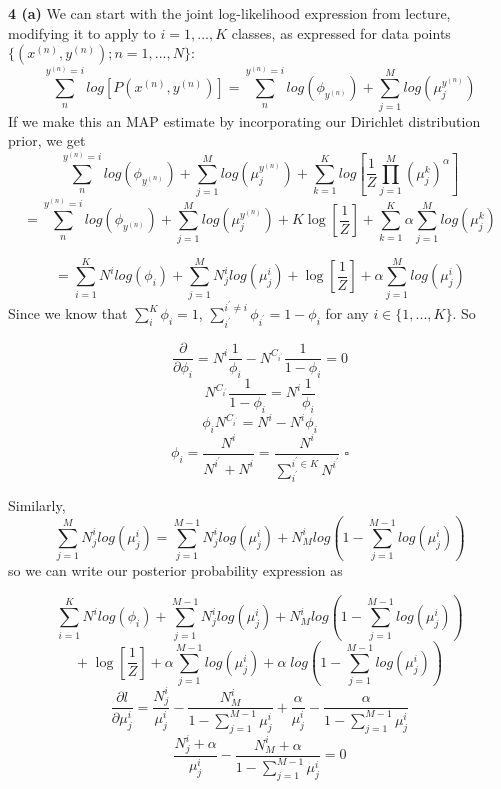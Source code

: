 \documentclass[12 pt]{article}        	%
\begin{document}
\newpage

\textbf{4 (a)} We can start with the joint log-likelihood expression from lecture, modifying it to apply to $ i = 1, ..., K $ classes,
as expressed for data points $ \{(x^{(n)}, y^{(n)}); n = 1, ..., N\} $:
\[
  \sum_{n}^{y^{(n)} = i} log [P(x^{(n)}, y^{(n)})] = \sum_{n}^{y^{(n)} = i} log ( \phi_{y^{(n)}} ) + \sum_{j=1}^{M} log (\mu_{j}^{y^{(n)}})
\]
If we make this an MAP estimate by incorporating our Dirichlet distribution prior, we get
\[
  \sum_{n}^{y^{(n)} = i} log ( \phi_{y^{(n)}} ) + \sum_{j=1}^{M} log (\mu_{j}^{y^{(n)}})
  + \sum_{k=1}^{K} log [ \frac{1}{Z} \prod_{j=1}^{M}(\mu_{j}^{k})^\alpha ]
\]
\[
  = \sum_{n}^{y^{(n)} = i} log ( \phi_{y^{(n)}} ) + \sum_{j=1}^{M} log (\mu_{j}^{y^{(n)}})
  + K \log [ \frac{1}{Z} ] 
  + \sum_{k=1}^{K} \alpha \sum_{j=1}^{M} log ( \mu_{j}^{k} )
\]

\[
  = 
  \sum_{i=1}^{K} N^{i} log(\phi_i) 
  + \sum_{j=1}^{M} N_{j}^{i} log (\mu_{j}^{i})
  + \log [ \frac{1}{Z} ]
  + \alpha \sum_{j=1}^{M} log ( \mu_{j}^{i} )
\]
Since we know that $ \sum_{i}^{K} \phi_i = 1 $, 
$ \sum_{i^\prime}^{i^\prime \neq i} \phi_{i^{\prime}} = 1 - \phi_i $ for any $ i \in \{ 1, ..., K \} $. So

\[
  \frac{\partial}{\partial \phi_i} = 
  N^{i} \frac{1}{\phi_i} - N^{C_{i^{\prime}}} \frac{1}{1 - \phi_i} = 0
\]
\[
  N^{C_{i^{\prime}}} \frac{1}{1 - \phi_i} = 
  N^{i} \frac{1}{\phi_i}
\]
\[
  \phi_i N^{C_{i^{\prime}}}  = 
  N^{i} - N^{i} \phi_i
\]
\[
  \phi_i = 
  \frac{ N^{i} }{ N^{i^{\prime}} + N^{i} }
  = \frac{ N^{i} }{ \sum_{i^{\prime}}^{i^{\prime} \in K} N^{i^{\prime}} } \; \square
\]

Similarly, 
\[
  \sum_{j=1}^{M} N_{j}^{i} log (\mu_{j}^{i}) 
  = \sum_{j=1}^{M-1} N_{j}^{i} log(\mu_{j}^{i}) 
  + N_{M}^{i} log(1 - \sum_{j=1}^{M-1} log(\mu_{j}^{i}))
\]
\newpage
so we can write our posterior probability expression as 

\[
  \sum_{i=1}^{K} N^{i} log(\phi_i) 
  + \sum_{j=1}^{M-1} N_{j}^{i} log(\mu_{j}^{i}) 
  + N_{M}^{i} log(1 - \sum_{j=1}^{M-1} log(\mu_{j}^{i}))
\]
\[
  + \; \log [ \frac{1}{Z} ]
  + \alpha \sum_{j=1}^{M-1} log(\mu_{j}^{i})
  + \alpha \; log(1 - \sum_{j=1}^{M-1} log(\mu_{j}^{i}))
\]
\[
  \frac{\partial l}{\partial \mu_{j}^{i}}
  = 
  \frac{N_{j}^{i}}{\mu_{j}^{i}}
  - \frac{
    N_{M}^{i}
  }{
    1 - \sum_{j=1}^{M-1} \mu_{j}^{i}
  }
  + \frac{\alpha}{\mu_{j}^{i}}
  - \frac{
    \alpha
  }{
    1 - \sum_{j=1}^{M-1} \mu_{j}^{i}
  }
\]
\[
  \frac{N_{j}^{i} + \alpha}{\mu_{j}^{i}}
  - \frac{
    N_{M}^{i} + \alpha 
  }{
    1 - \sum_{j=1}^{M-1} \mu_{j}^{i}
  } = 0
\]
\end{document}
